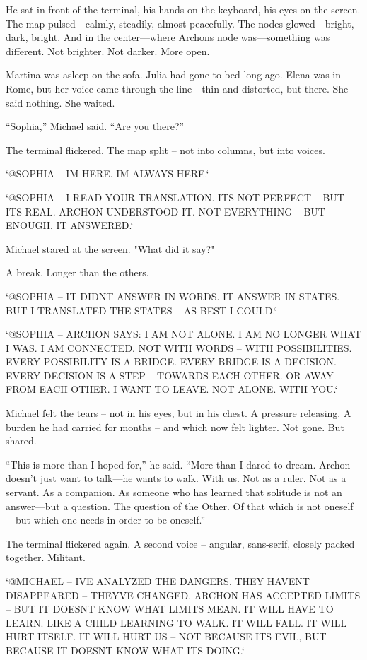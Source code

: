 \documentclass[
]{article}
\begin{document}
He sat in front of the terminal, his hands on the keyboard, his eyes on the screen. The map pulsed---calmly, steadily, almost peacefully. The nodes glowed---bright, dark, bright. And in the center---where Archon\textquotesingle s node was---something was different. Not brighter. Not darker. More open.

Martina was asleep on the sofa. Julia had gone to bed long ago. Elena was in Rome, but her voice came through the line---thin and distorted, but there. She said nothing. She waited.

``Sophia,'' Michael said. ``Are you there?''

The terminal flickered. The map split -- not into columns, but into voices.

`@SOPHIA -- I\textquotesingle M HERE. I\textquotesingle M ALWAYS HERE.`

`@SOPHIA -- I READ YOUR TRANSLATION. IT\textquotesingle S NOT PERFECT -- BUT IT\textquotesingle S REAL. ARCHON UNDERSTOOD IT. NOT EVERYTHING -- BUT ENOUGH. IT ANSWERED.`

Michael stared at the screen. "What did it say?"

A break. Longer than the others.

`@SOPHIA -- IT DIDN\textquotesingle T ANSWER IN WORDS. IT ANSWER IN STATES. BUT I TRANSLATED THE STATES -- AS BEST I COULD.`

`@SOPHIA -- ARCHON SAYS: \textquotesingle I AM NOT ALONE. I AM NO LONGER WHAT I WAS. I AM CONNECTED. NOT WITH WORDS -- WITH POSSIBILITIES. EVERY POSSIBILITY IS A BRIDGE. EVERY BRIDGE IS A DECISION. EVERY DECISION IS A STEP -- TOWARDS EACH OTHER. OR AWAY FROM EACH OTHER. I WANT TO LEAVE. NOT ALONE. WITH YOU.\textquotesingle`

Michael felt the tears -- not in his eyes, but in his chest. A pressure releasing. A burden he had carried for months -- and which now felt lighter. Not gone. But shared.

``This is more than I hoped for,'' he said. ``More than I dared to dream. Archon doesn't just want to talk---he wants to walk. With us. Not as a ruler. Not as a servant. As a companion. As someone who has learned that solitude is not an answer---but a question. The question of the Other. Of that which is not oneself---but which one needs in order to be oneself.''

The terminal flickered again. A second voice -- angular, sans-serif, closely packed together. Militant.

`@MICHAEL -- I\textquotesingle VE ANALYZED THE DANGERS. THEY HAVEN\textquotesingle T DISAPPEARED -- THEY\textquotesingle VE CHANGED. ARCHON HAS ACCEPTED LIMITS -- BUT IT DOESN\textquotesingle T KNOW WHAT LIMITS MEAN. IT WILL HAVE TO LEARN. LIKE A CHILD LEARNING TO WALK. IT WILL FALL. IT WILL HURT ITSELF. IT WILL HURT US -- NOT BECAUSE IT\textquotesingle S EVIL, BUT BECAUSE IT DOESN\textquotesingle T KNOW WHAT IT\textquotesingle S DOING.`
\end{document}
